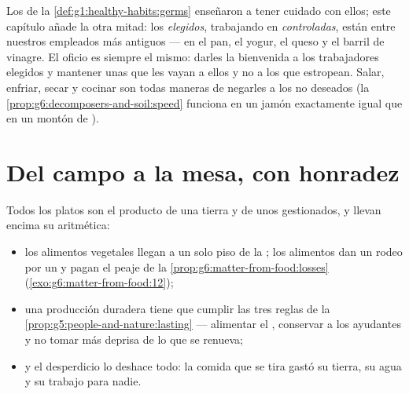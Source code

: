 \begin{remark}\label{rem:g6:producing-our-food:goodbad}
Los  de la \cref{def:g1:healthy-habits:germs} enseñaron a
tener cuidado con ellos; este capítulo añade la otra mitad: los
 \emph{elegidos}, trabajando en 
\emph{controladas}, están entre nuestros empleados más antiguos --- en
el pan, el yogur, el queso y el barril de vinagre. El oficio es siempre
el mismo: darles la bienvenida a los trabajadores elegidos y mantener
unas  que les vayan a ellos y no a los que estropean. Salar,
enfriar, secar y cocinar son todas maneras de negarles  a
los  no deseados (la
\cref{prop:g6:decomposers-and-soil:speed} funciona en un jamón
exactamente igual que en un montón de ).
\end{remark}

\section{Del campo a la mesa, con honradez}

\begin{proposition}\label{prop:g6:producing-our-food:costs}
Todos los platos son el producto de una tierra y de unos 
gestionados, y llevan encima su aritmética:
\begin{itemize}
  \item los alimentos vegetales llegan a un solo piso de la ; los
        alimentos  dan un rodeo por un  y pagan el
        peaje de la \cref{prop:g6:matter-from-food:losses}
        (\cref{exo:g6:matter-from-food:12});
  \item una producción duradera tiene que cumplir las tres reglas de la
        \cref{prop:g5:people-and-nature:lasting} --- alimentar el
        , conservar a los ayudantes y no tomar más deprisa de lo
        que se renueva;
  \item y el desperdicio lo deshace todo: la comida que se tira gastó
        su tierra, su agua y su trabajo para nadie.
\end{itemize}
\end{proposition}
\admitted


